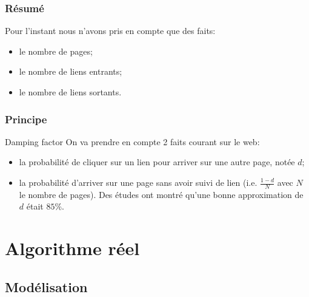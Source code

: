 \documentclass{beamer}
\begin{document}
\begin{frame}
  \tableofcontents[currentsection,subsectionstyle=hide]
\end{frame}

\begin{frame}
  \frametitle{Résumé}

  Pour l'instant nous n'avons pris en compte que des faits:\\
  
  \begin{itemize}
    \item le nombre de pages;
      \pause
    \item le nombre de liens entrants;
      \pause
    \item le nombre de liens sortants.
  \end{itemize}

\end{frame}

\begin{frame}
  \frametitle{Principe}

  \begin{block}{Damping factor}
    On va prendre en compte 2 faits courant sur le web:\\
    \begin{itemize}
    \item la probabilité de cliquer sur un lien pour arriver sur une
      autre page, notée $d$;
    \item la probabilité d'arriver sur une page sans avoir suivi
      de lien (i.e. $\frac{1 - d}{N}$ avec $N$ le nombre de pages). Des
      études ont montré qu'une bonne approximation de $d$ était
      $85\%$.
    \end{itemize}
  \end{block}
\end{frame}

\section{Algorithme réel}
\subsection{Modélisation}

\begin{frame}
  \tableofcontents[currentsection,subsectionstyle=hide]
\end{frame}
\end{document}
